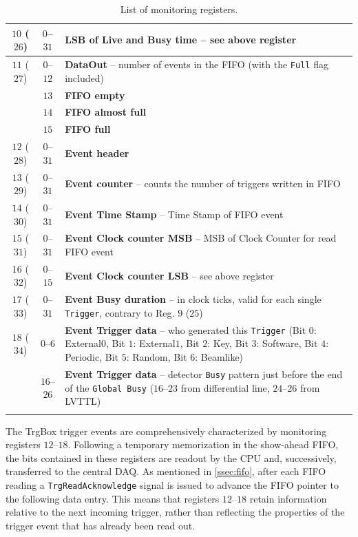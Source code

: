 {\begin{longtable}[H]{|c|c|p{11.5cm}|}
		\hline
		$10$ ($26$) & $0$--$31$ & \textbf{LSB of Live and Busy time} -- see above register \\
		\hline
		$11$ ($27$) & $0$--$12$ & \textbf{DataOut} -- number of events in the FIFO (with the \texttt{Full} flag included) \\
		& $13$ & \textbf{FIFO empty} \\
		& $14$ & \textbf{FIFO almost full} \\
		& $15$ & \textbf{FIFO full} \\
		\hline\hline
		$12$ ($28$) & $0$--$31$ & \textbf{Event header} \\
		\hline
		$13$ ($29$) & $0$--$31$ & \textbf{Event counter} -- counts the number of triggers written in FIFO\\
		\hline
		$14$ ($30$) & $0$--$31$ & \textbf{Event Time Stamp} -- Time Stamp of FIFO event \\
		\hline
		$15$ ($31$) & $0$--$31$ & \textbf{Event Clock counter MSB} -- MSB of Clock Counter for read FIFO event  \\
		\hline
		$16$ ($32$) & $0$--$15$ & \textbf{Event Clock counter LSB} -- see above register \\
		\hline
		$17$ ($33$) & $0$--$31$ & \textbf{Event Busy duration} -- in clock ticks, valid for each single \texttt{Trigger}, contrary to Reg. $9$ ($25$) \\
		\hline
		$18$ ($34$) & $0$--$6$ & \textbf{Event Trigger data} -- who generated this \texttt{Trigger} (Bit $0$: External$0$, Bit $1$: External$1$, Bit $2$: Key, Bit $3$: Software, Bit $4$: Periodic, Bit $5$: Random, Bit $6$: Beamlike) \\
		& $16$--$26$ & \textbf{Event Trigger data} -- detector \texttt{Busy} pattern just before the end of the \texttt{Global Busy} ($16$--$23$ from differential line, $24$--$26$ from LVTTL) \\
		\hline
		\caption[TrgBox monitoring registers]{List of monitoring registers.}
		\label{tab:monitor_registers}
\end{longtable}}
The TrgBox trigger events are comprehensively characterized by monitoring registers $12$--$18$. Following a temporary memorization in the show-ahead FIFO, the bits contained in these registers are readout by the CPU and, successively, transferred to the central DAQ. As mentioned in \autoref{ssec:fifo}, after each FIFO reading a \texttt{TrgReadAcknowledge} signal is issued to advance the FIFO pointer to the following data entry. This means that registers $12$--$18$ retain information relative to the next incoming trigger, rather than reflecting the properties of the trigger event that has already been read out.
